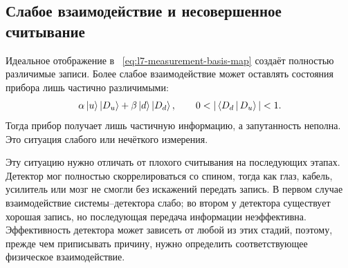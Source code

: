 \begin{classroomqa}
\end{classroomqa}

\subsection{Слабое взаимодействие и несовершенное считывание}

Идеальное отображение в ~\eqref{eq:l7-measurement-basis-map} создаёт полностью различимые записи. Более слабое взаимодействие может оставлять состояния прибора лишь частично различимыми:
\begin{equation}
\alpha\ket{u}\ket{D_u}
+\beta\ket{d}\ket{D_d},
\qquad
0<|\braket{D_d}{D_u}|<1.
\label{eq:l7-weak-measurement}
\end{equation}
Тогда прибор получает лишь частичную информацию, а запутанность неполна. Это ситуация слабого или нечёткого измерения.

Эту ситуацию нужно отличать от плохого считывания на последующих этапах. Детектор мог полностью скоррелироваться со спином, тогда как глаз, кабель, усилитель или мозг не смогли без искажений передать запись. В первом случае взаимодействие системы--детектора слабо; во втором у детектора существует хорошая запись, но последующая передача информации неэффективна. Эффективность детектора может зависеть от любой из этих стадий, поэтому, прежде чем приписывать причину, нужно определить соответствующее физическое взаимодействие.

\begin{classroomqa}
\end{classroomqa}


